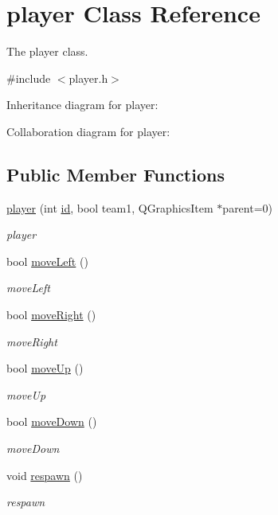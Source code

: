 \hypertarget{classplayer}{}\section{player Class Reference}
\label{classplayer}


The player class.  




{\ttfamily \#include $<$player.\+h$>$}



Inheritance diagram for player\+:


Collaboration diagram for player\+:
\subsection*{Public Member Functions}
\begin{DoxyCompactItemize}
\item 
\hyperlink{classplayer_abaa7dfbf31fde757bfd06f093913cc90}{player} (int \hyperlink{classplayer_ae9ae277c4f56fd68e1251c4eb54ef5c5}{id}, bool team1, Q\+Graphics\+Item $\ast$parent=0)
\begin{DoxyCompactList}\small\item\em player \end{DoxyCompactList}\item 
bool \hyperlink{classplayer_ac1e7c2c05002613ef367764cfa62e1af}{move\+Left} ()
\begin{DoxyCompactList}\small\item\em move\+Left \end{DoxyCompactList}\item 
bool \hyperlink{classplayer_a66b470ed0eb579437f8fbb8cdc7ebfac}{move\+Right} ()
\begin{DoxyCompactList}\small\item\em move\+Right \end{DoxyCompactList}\item 
bool \hyperlink{classplayer_a63f66a49bcc29eacc7bef303f5dcbf80}{move\+Up} ()
\begin{DoxyCompactList}\small\item\em move\+Up \end{DoxyCompactList}\item 
bool \hyperlink{classplayer_a73408216e6b07f34d9213a2dbe4341c1}{move\+Down} ()
\begin{DoxyCompactList}\small\item\em move\+Down \end{DoxyCompactList}\item 
void \hyperlink{classplayer_a519784459639f6b785bcfeaa05b6f604}{respawn} ()\hypertarget{classplayer_a519784459639f6b785bcfeaa05b6f604}{}\label{classplayer_a519784459639f6b785bcfeaa05b6f604}

\begin{DoxyCompactList}\small\item\em respawn \end{DoxyCompactList}\end{DoxyCompactItemize}
